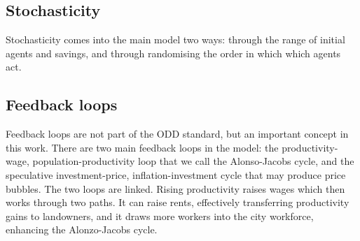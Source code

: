 \subsection{Stochasticity}
Stochasticity comes into the main model two ways: through the range of initial agents and savings, and through randomising the order in which which agents act.


\subsection{Feedback loops}
Feedback loops are not part of the ODD standard, but an important concept in this work. 
There are two main \glspl{feedback loop} in the model: the productivity-wage, population-productivity loop that we call the Alonso-Jacobs cycle, and the speculative investment-price, inflation-investment cycle that may produce price bubbles. 
The two loops are linked. Rising productivity raises wages which then works through two paths. It can raise rents, effectively transferring productivity gains to landowners, and it draws more workers into the city workforce, enhancing the \Gls{Alonzo-Jacobs cycle}.

